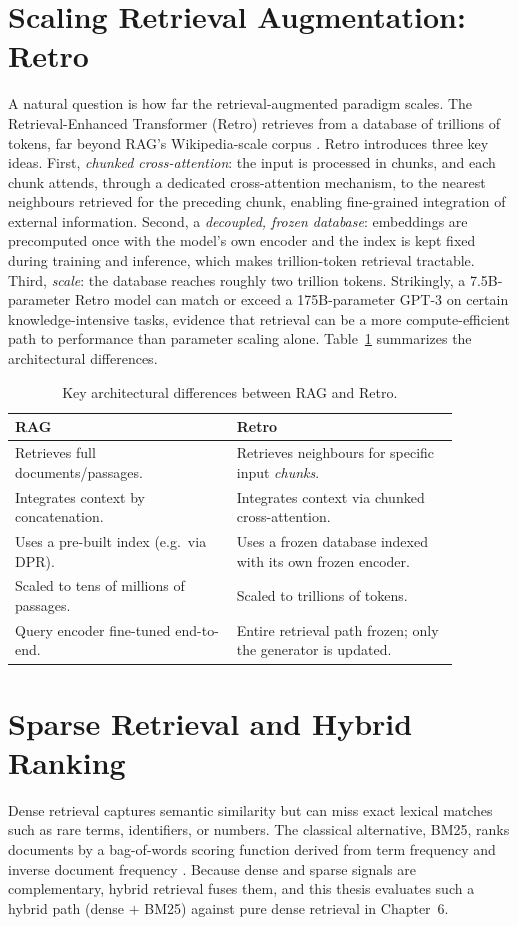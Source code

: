 \documentclass[12pt,a4paper,titlepage,oneside]{book}
\begin{document}
\section{Scaling Retrieval Augmentation: Retro}
A natural question is how far the retrieval-augmented paradigm scales. The Retrieval-Enhanced Transformer (Retro) retrieves from a database of trillions of tokens, far beyond RAG's Wikipedia-scale corpus \cite{deepmind2022retro}. Retro introduces three key ideas. First, \emph{chunked cross-attention}: the input is processed in chunks, and each chunk attends, through a dedicated cross-attention mechanism, to the nearest neighbours retrieved for the preceding chunk, enabling fine-grained integration of external information. Second, a \emph{decoupled, frozen database}: embeddings are precomputed once with the model's own encoder and the index is kept fixed during training and inference, which makes trillion-token retrieval tractable. Third, \emph{scale}: the database reaches roughly two trillion tokens. Strikingly, a 7.5B-parameter Retro model can match or exceed a 175B-parameter GPT-3 on certain knowledge-intensive tasks, evidence that retrieval can be a more compute-efficient path to performance than parameter scaling alone. Table~\ref{tab:rag-vs-retro} summarizes the architectural differences.

\begin{table}[htbp]
\centering
\caption{Key architectural differences between RAG and Retro.}
\label{tab:rag-vs-retro}
\begin{tabular}{p{0.44\linewidth}p{0.44\linewidth}}
\toprule
\textbf{RAG} & \textbf{Retro} \\
\midrule
Retrieves full documents/passages. & Retrieves neighbours for specific input \emph{chunks}. \\
Integrates context by concatenation. & Integrates context via chunked cross-attention. \\
Uses a pre-built index (e.g.\ via DPR). & Uses a frozen database indexed with its own frozen encoder. \\
Scaled to tens of millions of passages. & Scaled to trillions of tokens. \\
Query encoder fine-tuned end-to-end. & Entire retrieval path frozen; only the generator is updated. \\
\bottomrule
\end{tabular}
\end{table}

\section{Sparse Retrieval and Hybrid Ranking}
Dense retrieval captures semantic similarity but can miss exact lexical matches such as rare terms, identifiers, or numbers. The classical alternative, BM25, ranks documents by a bag-of-words scoring function derived from term frequency and inverse document frequency \cite{robertson2009bm25}. Because dense and sparse signals are complementary, hybrid retrieval fuses them, and this thesis evaluates such a hybrid path (dense $+$ BM25) against pure dense retrieval in Chapter~6.
\end{document}
